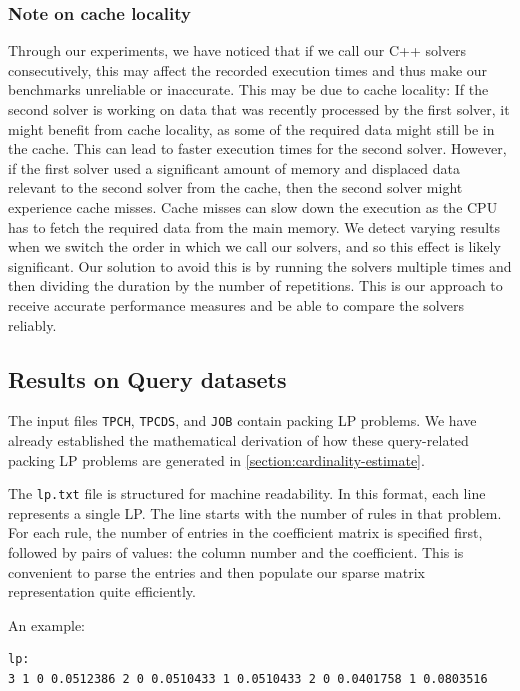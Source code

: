 \subsubsection{Note on cache locality}
Through our experiments, we have noticed that if we call our C++ solvers
consecutively, this may affect the recorded execution times and thus make our benchmarks
unreliable or inaccurate. This may be due to cache locality: If the second solver is working
on data that was recently processed by the first solver, it might benefit from cache locality,
as some of the required data
might still be in the cache. This can lead to faster execution times for the second solver.
However, if the first solver used a significant amount of memory and displaced data relevant
to the second solver from the cache, then the second solver might experience cache misses.
Cache misses
can slow down the execution as the CPU has to fetch the required data from the main memory.
We detect varying results when we switch the order in which we call our solvers, and so
this effect is likely significant.
Our solution to avoid this is by running the solvers multiple times and then dividing the duration by the number of repetitions. This is our approach to receive
accurate performance measures and be able to compare the solvers reliably.

\subsection{Results on Query datasets}
The input files \texttt{TPCH}, \texttt{TPCDS}, and \texttt{JOB} contain packing
LP problems. We have already established the mathematical derivation of how
these query-related packing
LP problems are generated in \ref{section:cardinality-estimate}.

The \texttt{lp.txt} file is structured for machine readability.
In this format, each line represents a single LP. The line starts with
the number of rules in that problem. For each rule, the number of entries in
the coefficient matrix is specified first, followed by pairs of values:
the column number and the coefficient. This is convenient to parse the entries
and then populate our sparse matrix representation quite efficiently.

An example:\begin{lstlisting}
lp:
3 1 0 0.0512386 2 0 0.0510433 1 0.0510433 2 0 0.0401758 1 0.0803516
\end{lstlisting} \label{format_input}

